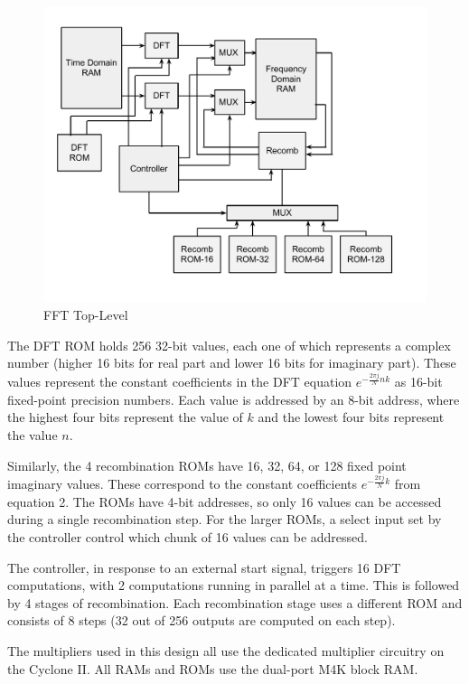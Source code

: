 \documentclass{article}
\begin{document}
\begin{figure}[H]
	\centering
	\includegraphics[scale=0.3]{fft-top}
	\caption{FFT Top-Level}
\end{figure}

The DFT ROM holds 256 32-bit values, each one of which represents a
complex number (higher 16 bits for real part and lower 16 bits for
imaginary part). These values represent the constant coefficients
in the DFT equation \(e^{-\frac{2\pi j}{N} n k}\) as 16-bit fixed-point
precision numbers. Each value is addressed by an 8-bit address, where
the highest four bits represent the value of \(k\) and the lowest four bits
represent the value \(n\).

Similarly, the 4 recombination ROMs have 16, 32, 64, or 128 fixed point
imaginary values. These correspond to the constant coefficients
\(e^{-\frac{2\pi j}{N}k}\) from equation 2. The ROMs have 4-bit addresses, 
so only 16 values can be accessed during a single recombination step. 
For the larger ROMs, a select input set by the controller control which 
chunk of 16 values can be addressed.

The controller, in response to an external start signal, triggers
16 DFT computations, with 2 computations running in parallel at a time.
This is followed by 4 stages of recombination. Each recombination stage
uses a different ROM and consists of 8 steps (32 out of 256 outputs are
computed on each step).

The multipliers used in this design all use the dedicated multiplier 
circuitry on the Cyclone II. All RAMs and ROMs use the dual-port M4K
block RAM.
	
\end{document}
